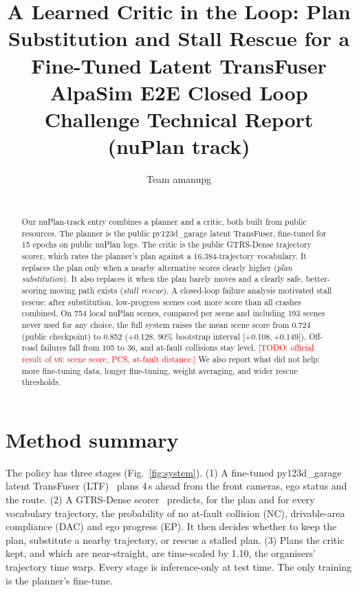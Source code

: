 \documentclass{article}
\title{A Learned Critic in the Loop: Plan Substitution and Stall Rescue for a Fine-Tuned Latent TransFuser\\
\large AlpaSim E2E Closed Loop Challenge Technical Report (nuPlan track)}
\author{
  Team amanupg \\
  \todo{author name(s), organization} \\
  \texttt{\todo{contact email}}
}
\newcommand{\todo}[1]{\textcolor{red}{[TODO: #1]}}
\begin{document}
\maketitle

\begin{abstract}
Our nuPlan-track entry combines a planner and a critic, both built from public resources. The planner is the
public py123d\_garage latent TransFuser, fine-tuned for 15 epochs on public nuPlan logs. The critic is the public
GTRS-Dense trajectory scorer, which rates the planner's plan against a 16{,}384-trajectory vocabulary. It replaces
the plan only when a nearby alternative scores clearly higher (\emph{plan substitution}). It also replaces it when
the plan barely moves and a clearly safe, better-scoring moving path exists (\emph{stall rescue}). A closed-loop
failure analysis motivated stall rescue: after substitution, low-progress scenes cost more score than all crashes
combined. On 754 local nuPlan scenes, compared per scene and including 193 scenes never used for any choice, the
full system raises the mean scene score from 0.724 (public checkpoint) to 0.852 (+0.128, 90\% bootstrap interval
[+0.108,\,+0.149]). Off-road failures fall from 105 to 36, and at-fault collisions stay level. \todo{official
result of v6: scene score, PCS, at-fault distance.} We also report what did not help: more fine-tuning data, longer
fine-tuning, weight averaging, and wider rescue thresholds.
\end{abstract}

\section{Method summary}
The policy has three stages (Fig.~\ref{fig:system}). (1) A fine-tuned py123d\_garage latent TransFuser
(LTF)~\cite{py123d} plans 4\,s ahead from the front cameras, ego status and the route. (2) A GTRS-Dense
scorer~\cite{simscale,gtrs} predicts, for the plan and for every vocabulary trajectory, the probability of no
at-fault collision (NC), drivable-area compliance (DAC) and ego progress (EP). It then decides whether to keep the plan,
substitute a nearby trajectory, or rescue a stalled plan. (3) Plans the critic kept, and which are near-straight, are
time-scaled by 1.10, the organisers' trajectory time warp. Every stage is inference-only at test time. The only
training is the planner's fine-tune.
\end{document}

